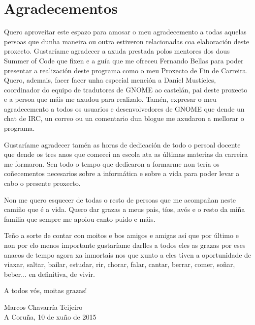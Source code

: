 %
%

\section*{Agradecementos}

Quero aproveitar este espazo para amosar o meu agradecemento a todas aquelas persoas que dunha maneira ou outra estiveron relacionadas coa elaboración deste proxecto. Gustaríame agradecer a axuda prestada polos mentores dos dous Summer of Code que fixen e a guía que me ofreceu Fernando Bellas para poder presentar a realización deste programa como o meu Proxecto de Fin de Carreira. Quero, ademais, facer facer unha especial mención a Daniel Mustieles, coordinador do equipo de tradutores de GNOME ao castelán, pai deste proxecto e a persoa que máis me axudou para realizalo. Tamén, expresar o meu agradecemento a todos os usuarios e desenvolvedores de GNOME que dende un chat de IRC, un correo ou un comentario dun blogue me axudaron a mellorar o programa.

Gustaríame agradecer tamén as horas de dedicación de todo o persoal docente que dende os tres anos que comecei na escola ata as últimas materias da carreira me formaron. Sen todo o tempo que dedicaron a formarme non tería os coñecementos necesarios sobre a informática e sobre a vida para poder levar a cabo o presente proxecto.

Non me quero esquecer de todas o resto de persoas que me acompañan neste camiño que é a vida. Quero dar grazas a meus pais, tíos, avós  e o resto da miña familia que sempre me apoiou canto puido e máis.

Teño a sorte de contar con moitos e bos amigos e amigas así que por último e non por elo menos importante gustaríame darlles a todos eles as grazas por eses anacos de tempo agora xa inmortais nos que xunto a eles tiven a oportunidade de viaxar, saltar, bailar, estudar, rir, chorar, falar, cantar, berrar, comer, soñar, beber... en definitiva, de vivir. 

A todos vós, moitas grazas!


\begin{flushright}
  Marcos Chavarría Teijeiro \\
  A Coruña, 10 de xuño de 2015
\end{flushright}

